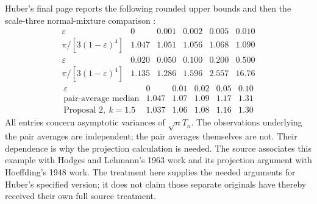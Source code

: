 Huber's final page reports the following rounded upper bounds
and then the scale-three normal-mixture comparison
\cite[pp.~100--101]{Huber1964RobustLocation}:
\[
\begin{array}{c|rrrrr}
\varepsilon&0&0.001&0.002&0.005&0.010\\\hline
\pi/[3(1-\varepsilon)^4]&1.047&1.051&1.056&1.068&1.090\\
\varepsilon&0.020&0.050&0.100&0.200&0.500\\\hline
\pi/[3(1-\varepsilon)^4]&1.135&1.286&1.596&2.557&16.76
\end{array}
\]
\[
\begin{array}{c|rrrrr}
\varepsilon&0&0.01&0.02&0.05&0.10\\\hline
\text{pair-average median}&1.047&1.07&1.09&1.17&1.31\\
\text{Proposal 2},\ k=1.5&1.037&1.06&1.08&1.16&1.30
\end{array}
\]
All entries concern asymptotic variances of \(\sqrt nT_n\).
The observations underlying the pair averages are independent;
the pair averages themselves are not. Their dependence is why
the projection calculation is needed.
The source associates this example with Hodges and Lehmann's
1963 work and its projection argument with Hoeffding's 1948 work.
The treatment here supplies the needed arguments for Huber's
specified version; it does not claim those separate originals
have thereby received their own full source treatment.
